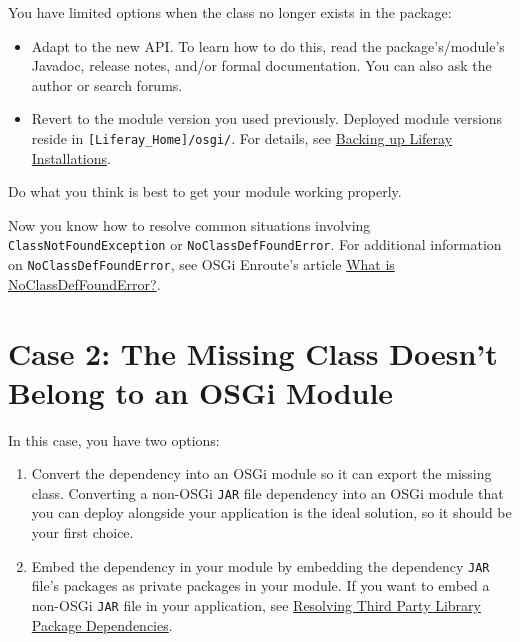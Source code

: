 \begin{enumerate}
  You have limited options when the class no longer exists in the
  package:

  \begin{itemize}
  \item
    Adapt to the new API. To learn how to do this, read the
    package's/module's Javadoc, release notes, and/or formal
    documentation. You can also ask the author or search forums.
  \item
    Revert to the module version you used previously. Deployed module
    versions reside in \texttt{{[}Liferay\_Home{]}/osgi/}. For details,
    see
    \href{/docs/7-2/deploy/-/knowledge_base/d/backing-up-a-liferay-installation}{Backing
    up Liferay Installations}.
  \end{itemize}

  Do what you think is best to get your module working properly.
\end{enumerate}

Now you know how to resolve common situations involving
\texttt{ClassNotFoundException} or \texttt{NoClassDefFoundError}. For
additional information on \texttt{NoClassDefFoundError}, see OSGi
Enroute's article
\href{http://enroute.osgi.org/faq/class-not-found-exception.html}{What
is NoClassDefFoundError?}.

\section{Case 2: The Missing Class Doesn't Belong to an OSGi
Module}\label{case-2-the-missing-class-doesnt-belong-to-an-osgi-module}

In this case, you have two options:

\begin{enumerate}
\def\labelenumi{\arabic{enumi}.}
\item
  Convert the dependency into an OSGi module so it can export the
  missing class. Converting a non-OSGi \texttt{JAR} file dependency into
  an OSGi module that you can deploy alongside your application is the
  ideal solution, so it should be your first choice.
\item
  Embed the dependency in your module by embedding the dependency
  \texttt{JAR} file's packages as private packages in your module. If
  you want to embed a non-OSGi \texttt{JAR} file in your application,
  see
  \href{https://portal.liferay.dev/docs/7-2/customization/-/knowledge_base/c/adding-third-party-libraries-to-a-module}{Resolving
  Third Party Library Package Dependencies}.
\end{enumerate}

